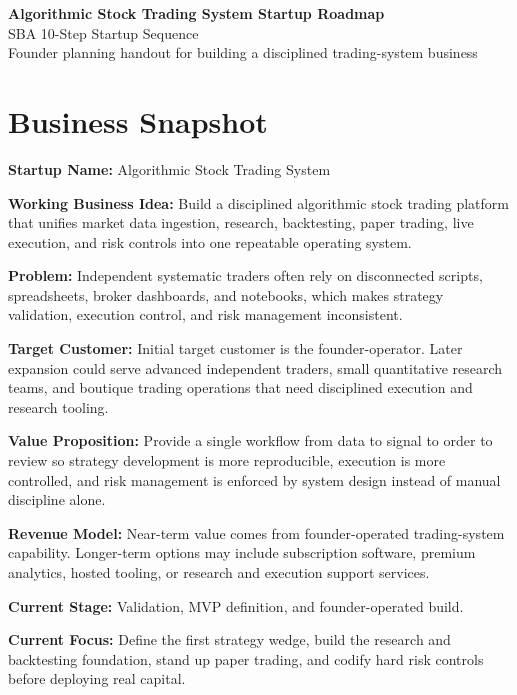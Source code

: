 \documentclass[11pt]{article}
\begin{document}
\begin{center}
    {\LARGE\bfseries Algorithmic Stock Trading System Startup Roadmap}\\[4pt]
    {\large SBA 10-Step Startup Sequence}\\[6pt]
    {\normalsize Founder planning handout for building a disciplined trading-system business}
\end{center}

\vspace{4pt}
\section*{Business Snapshot}
{\small
\textbf{Startup Name:} Algorithmic Stock Trading System\par
\textbf{Working Business Idea:} Build a disciplined algorithmic stock trading platform that unifies market data ingestion, research, backtesting, paper trading, live execution, and risk controls into one repeatable operating system.\par
\textbf{Problem:} Independent systematic traders often rely on disconnected scripts, spreadsheets, broker dashboards, and notebooks, which makes strategy validation, execution control, and risk management inconsistent.\par
\textbf{Target Customer:} Initial target customer is the founder-operator. Later expansion could serve advanced independent traders, small quantitative research teams, and boutique trading operations that need disciplined execution and research tooling.\par
\textbf{Value Proposition:} Provide a single workflow from data to signal to order to review so strategy development is more reproducible, execution is more controlled, and risk management is enforced by system design instead of manual discipline alone.\par
\textbf{Revenue Model:} Near-term value comes from founder-operated trading-system capability. Longer-term options may include subscription software, premium analytics, hosted tooling, or research and execution support services.\par
\textbf{Current Stage:} Validation, MVP definition, and founder-operated build.\par
\textbf{Current Focus:} Define the first strategy wedge, build the research and backtesting foundation, stand up paper trading, and codify hard risk controls before deploying real capital.\par
}
\end{document}
